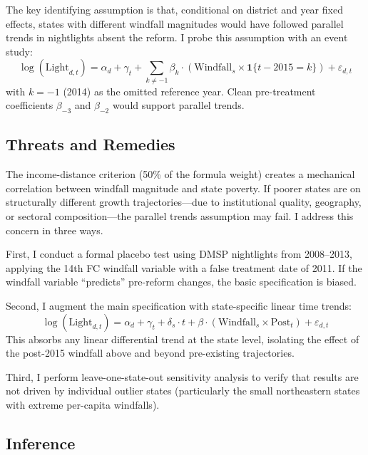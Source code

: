 \documentclass[12pt]{article}
\begin{document}
The key identifying assumption is that, conditional on district and year fixed effects, states with different windfall magnitudes would have followed parallel trends in nightlights absent the reform. I probe this assumption with an event study:
\begin{equation}
\log(\text{Light}_{d,t}) = \alpha_d + \gamma_t + \sum_{k \neq -1} \beta_k \cdot (\text{Windfall}_s \times \mathbf{1}\{t - 2015 = k\}) + \varepsilon_{d,t}
\label{eq:eventstudy}
\end{equation}
with $k = -1$ (2014) as the omitted reference year. Clean pre-treatment coefficients $\beta_{-3}$ and $\beta_{-2}$ would support parallel trends.

\subsection{Threats and Remedies}

The income-distance criterion (50\% of the formula weight) creates a mechanical correlation between windfall magnitude and state poverty. If poorer states are on structurally different growth trajectories---due to institutional quality, geography, or sectoral composition---the parallel trends assumption may fail. I address this concern in three ways.

First, I conduct a formal placebo test using DMSP nightlights from 2008--2013, applying the 14th FC windfall variable with a false treatment date of 2011. If the windfall variable ``predicts'' pre-reform changes, the basic specification is biased.

Second, I augment the main specification with state-specific linear time trends:
\begin{equation}
\log(\text{Light}_{d,t}) = \alpha_d + \gamma_t + \delta_s \cdot t + \beta \cdot (\text{Windfall}_s \times \text{Post}_t) + \varepsilon_{d,t}
\label{eq:trends}
\end{equation}
This absorbs any linear differential trend at the state level, isolating the effect of the post-2015 windfall above and beyond pre-existing trajectories.

Third, I perform leave-one-state-out sensitivity analysis to verify that results are not driven by individual outlier states (particularly the small northeastern states with extreme per-capita windfalls).

\subsection{Inference}
\end{document}
